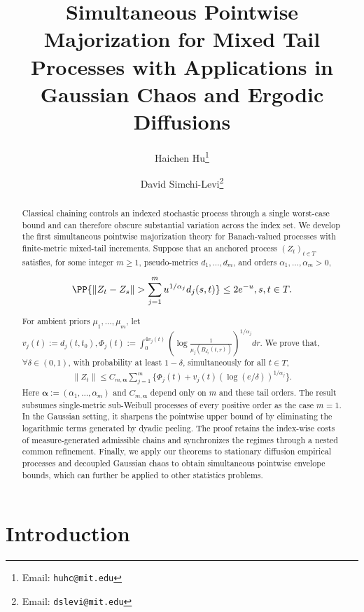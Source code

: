 \documentclass[11pt]{article}
\title{\normalfont Simultaneous Pointwise Majorization for Mixed Tail Processes with Applications in Gaussian Chaos and Ergodic Diffusions
}
\author[1]{Haichen Hu\thanks{{Email: \texttt{huhc@mit.edu}}}}
\author[1]{David Simchi-Levi\thanks{{Email: \texttt{dslevi@mit.edu}}}}
\affil[1]{{\small\itshape
Massachusetts Institute of Technology, 77 Massachusetts Avenue,
Cambridge, MA 02139, USA}}
\begin{document}
\maketitle
\singlespacing
\vspace{-2em}
\begin{abstract}
Classical chaining controls an indexed stochastic process through a
single worst-case bound and can therefore obscure substantial variation
across the index set. We develop the first simultaneous pointwise
majorization theory for Banach-valued processes with
finite-metric mixed-tail increments. Suppose that an anchored process
$(Z_t)_{t\in T}$ satisfies, for some integer $m\ge1$, pseudo-metrics
$d_1,\ldots,d_m$, and orders $\alpha_1,\ldots,\alpha_m>0$,

\begin{align*}
\PP\{
\|Z_t-Z_s\|>
\sum_{j=1}^m u^{1/\alpha_j}d_j(s,t)
\}
\le 2e^{-u},
s,t\in T.
\end{align*}

For ambient priors $\mu_1,\ldots,\mu_m$, let $v_j(t)
:=d_j(t,t_0), \Phi_j(t):=
\int_0^{4v_j(t)}
(
\log\frac{1}{\mu_j(B_{d_j}(t,r))}
)^{1/\alpha_j}dr$.
We prove that, $\forall \delta\in(0,1)$, with probability at least
$1-\delta$, simultaneously for all $t\in T$,
\begin{align*}
\|Z_t\|
\le
C_{m,\boldsymbol\alpha}
\sum_{j=1}^m
\{
\Phi_j(t)
+
v_j(t)
(\log(e/\delta))^{1/\alpha_j}
\}.
\end{align*}
Here $\boldsymbol\alpha:=(\alpha_1,\ldots,\alpha_m)$ and
$C_{m,\boldsymbol\alpha}$ depend only on $m$ and these tail orders.
The result subsumes single-metric sub-Weibull processes of every positive order as the case $m=1$. In the Gaussian setting, it sharpens the pointwise upper bound of \citet{xu2026} by eliminating the logarithmic terms generated by dyadic peeling. The proof retains the index-wise costs
of measure-generated admissible chains and synchronizes the regimes through a nested common refinement. Finally, we  apply our theorems to stationary diffusion empirical processes and decoupled Gaussian chaos to obtain simultaneous pointwise envelope bounds, which can further be applied to other statistics problems.
\end{abstract}
\vspace{-2em}

\section{Introduction}
\label{sec:introduction}
\end{document}
